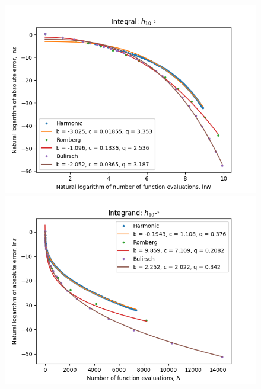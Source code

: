 \begin{figure}[H]
\centering
\begin{minipage}{0.45\textwidth}
\centering
\includegraphics[scale=0.45]{romberg_plots/h_hundredth_hp_log_log_pow_fit_trend.png}
\end{minipage}
\begin{minipage}{0.45\textwidth}
\centering
\includegraphics[scale=0.45]{romberg_plots/h_hundredth_hp_trend.png}
\end{minipage}
\end{figure}

